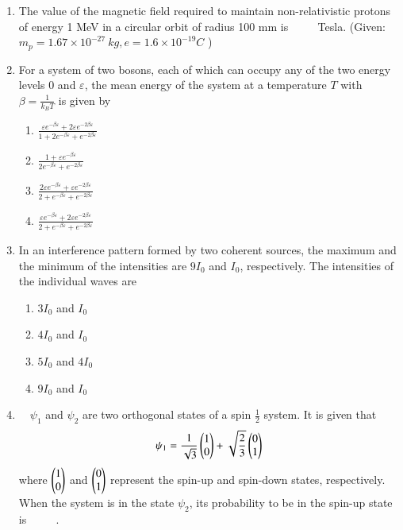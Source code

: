 \documentclass[journal]{IEEEtran}
\begin{document}
\begin{enumerate}
  \item The value of the magnetic field required to maintain non-relativistic protons of energy 1 MeV in a circular orbit of radius 100 mm is $\qquad$ Tesla.
(Given: $m_{p}=1.67 \times 10^{-27} {~kg}, e=1.6 \times 10^{-19} {C}$ )

\item  For a system of two bosons, each of which can occupy any of the two energy levels 0 and $\varepsilon$, the mean energy of the system at a temperature $T$ with $\beta=\frac{1}{k_{B} T}$ is given by
 \begin{multicols}{4}
			\begin{enumerate}
   
 
   \item$\frac{\varepsilon e^{-\beta \varepsilon}+2 \varepsilon e^{-2 \beta \varepsilon}}{1+2 e^{-\beta \varepsilon}+e^{-2 \beta \varepsilon}}$
\item  $\frac{1+\varepsilon e^{-\beta \varepsilon}}{2 e^{-\beta \varepsilon}+e^{-2 \beta \varepsilon}}$
\item  $\frac{2 \varepsilon e^{-\beta \varepsilon}+\varepsilon e^{-2 \beta \varepsilon}}{2+e^{-\beta \varepsilon}+e^{-2 \beta \varepsilon}}$
\item $\frac{\varepsilon e^{-\beta \varepsilon}+2 \varepsilon e^{-2 \beta \varepsilon}}{2+e^{-\beta \varepsilon}+e^{-2 \beta \varepsilon}}$
 \end{enumerate}
	\end{multicols}
  \item In an interference pattern formed by two coherent sources, the maximum and the minimum of the intensities are $9 I_{0}$ and $I_{0}$, respectively. The intensities of the individual waves are
  

\begin{multicols}{4}
			\begin{enumerate}
   \item $3 I_{0}$ and $I_{0}$
\item  $4 I_{0}$ and $I_{0}$
\item $5 I_{0}$ and $4 I_{0}$
\item $9 I_{0}$ and $I_{0}$
\end{enumerate}
		\end{multicols}
  \item  $\quad \psi_{1}$ and $\psi_{2}$ are two orthogonal states of a spin $\frac{1}{2}$ system. It is given that
$$
\psi_{1}=\frac{1}{\sqrt{3}}\begin{pmatrix}{1}\\{0}\end{pmatrix}+\sqrt{\frac{2}{3}}\begin{pmatrix}{0}\\{1}\end{pmatrix}
$$
where $\begin{pmatrix}{1}\\{0}\end{pmatrix}$ and $\begin{pmatrix}{0} \\{1}\end{pmatrix}$ represent the spin-up and spin-down states, respectively. When the system is in the state $\psi_{2}$, its probability to be in the spin-up state is $\qquad$ .
 
			
		
 \end{enumerate}
\end{document}
